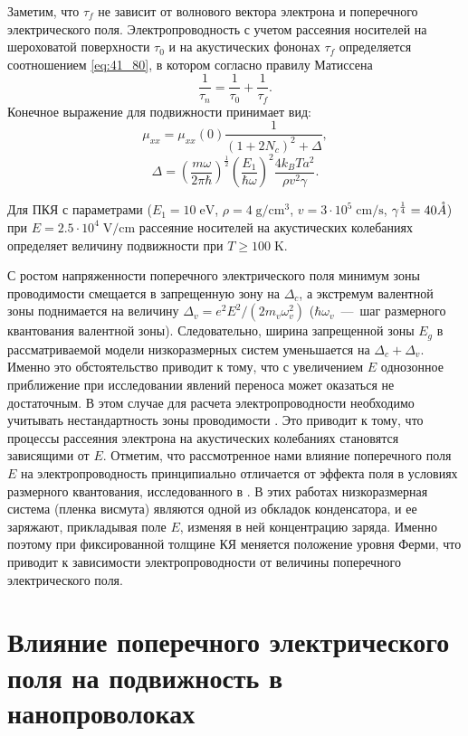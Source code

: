 Заметим, что $\tau_f $ не зависит от волнового вектора электрона и поперечного электрического поля. Электропроводность с учетом рассеяния носителей на шероховатой поверхности $\tau_0 $ и на акустических фононах $\tau_f $ определяется соотношением \eqref{eq:41_80}, в котором согласно правилу Матиссена
\[
\frac{1}{\tau_n } =\frac{1}{\tau_0 } +\frac{1}{\tau_f } .
\]
Конечное выражение для подвижности принимает вид:
\begin{equation} \label{eq:41_110}
\mu_{xx} =\mu _{xx}(0)\frac{1}{\left(1+2N_c \right)^2 +\Delta } , 
\end{equation} 
\[
\Delta =\left(\frac{m\omega }{2\pi \hbar } \right)^{\frac{1}{2} } \left(\frac{E_1 }{\hbar \omega } \right)^2 \frac{4k_B T a^2 }{\rho v^2 \gamma }. 
\] 

Для ПКЯ с параметрами ($E_1 = 10\mathrm{\; eV}$, $\rho =4 \mathrm{\;g/cm^3}$, $v=3\cdot 10^5 \mathrm{\;cm/s}$, $\gamma^{\frac{1}{4}} = 40 \AA$) при $E=2.5\cdot 10^4 \mathrm{\;V/cm}$ рассеяние носителей на акустических колебаниях определяет величину подвижности при $T \ge 100 \mathrm{\; K}$.

С ростом напряженности поперечного электрического поля минимум зоны проводимости смещается в запрещенную зону на $\Delta_c $, а экстремум валентной зоны поднимается на величину $\Delta_v =e^2 E^2  / (2m_v  \omega_v^2 )$ ($\hbar \omega_v $~---~шаг размерного квантования валентной зоны). Следовательно, ширина запрещенной зоны $E_g$ в рассматриваемой модели низкоразмерных систем уменьшается на $\Delta_c +\Delta_v $. Именно это обстоятельство приводит к тому, что с увеличением $E$ однозонное приближение при исследовании явлений переноса может оказаться не достаточным. В этом случае для расчета электропроводности необходимо учитывать нестандартность зоны проводимости \cite{Lax1960,Cohen1961}. Это приводит к тому, что процессы рассеяния электрона на акустических колебаниях становятся зависящими от $E$. Отметим, что рассмотренное нами влияние поперечного поля $E$ на электропроводность принципиально отличается от эффекта поля в условиях размерного квантования, исследованного в \cite{Sandomirsky1967,Butenko1998}. В этих работах низкоразмерная система (пленка висмута) являются одной из обкладок конденсатора, и ее заряжают, прикладывая поле $E$, изменяя в ней концентрацию заряда. Именно поэтому при фиксированной толщине КЯ меняется положение уровня Ферми, что приводит к зависимости электропроводности от величины поперечного электрического поля.

\section{Влияние поперечного электрического поля на подвижность в нанопроволоках} \label{sect4_2}

